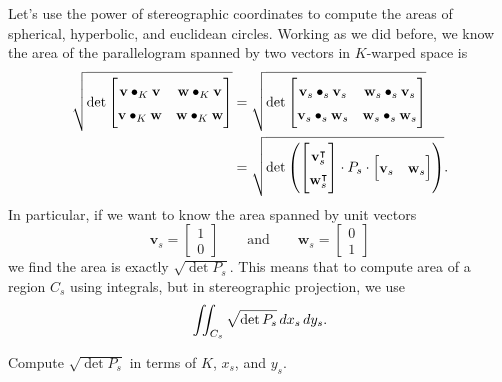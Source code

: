\documentclass[newpage,hints,12pt,noauthor,nooutcomes]{ximera}
\begin{document}
Let's use the power of stereographic coordinates to compute the areas
of spherical, hyperbolic, and euclidean circles. Working as we did
before, we know the area of the parallelogram spanned by two vectors
in $K$-warped space is%
  \begin{align*}
  \sqrt{\det
    \begin{bmatrix}
      \mathbf{v}\bullet_{K}\mathbf{v} & \mathbf{w}\bullet_{K}\mathbf{v}\\
      \mathbf{v}\bullet_{K}\mathbf{w} & \mathbf{w}\bullet_{K}\mathbf{w}
    \end{bmatrix}}
  &=\sqrt{\det
    \begin{bmatrix}
      \mathbf{v}_s\bullet_{s}\mathbf{v}_s & \mathbf{w}_s\bullet_{s}\mathbf{v}_s\\
      \mathbf{v}_s\bullet_{s}\mathbf{w}_s & \mathbf{w}_s\bullet_{s}\mathbf{w}_s
    \end{bmatrix}}\\
  &=
  \sqrt{\det\left({\renewcommand*{\arraystretch}{1.4} 
      \begin{bmatrix}
        \mathbf{v}_s^\transpose \\
        \mathbf{w}_s^\transpose
      \end{bmatrix}}
      \cdot P_s\cdot 
      \begin{bmatrix}
        \mathbf{v}_s & \mathbf{w}_s%
      \end{bmatrix}
    \right) }.
  \end{align*}
  In particular, if we want to know the area spanned by unit vectors
  \[
  \mathbf{v}_s = \begin{bmatrix}
    1\\
    0
  \end{bmatrix}
  \qquad\text{and}\qquad
    \mathbf{w}_s = \begin{bmatrix}
    0\\
    1
  \end{bmatrix}
    \]
    we find the area is exactly $\sqrt{\det P_s}$. This means that to
    compute area of a region $C_s$ using integrals, but in stereographic
    projection, we use
    \[
    \iint_{C_s} \sqrt{\det P_s}\,d x_s\,d y_s.
    \]
    
\begin{problem}
  Compute $\sqrt{\det P_s}$ in terms of $K$, $x_s$, and $y_s$.
\end{problem}
\end{document}
